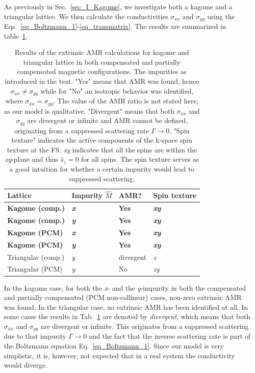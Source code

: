 \documentclass[prb,showpacs,amsmath,amssymb,superscriptaddress,twocolumn,floatfix]{revtex4-1}
\begin{document}
As previously in Sec.~\ref{sec_I_Kagome}, we investigate both a kagome and a triangular lattice. We then calculate the conductivities $\sigma_{xx}$ and $\sigma_{yy}$ using the Eqs.~\ref{eq_Boltzmann_1}-\ref{eq_transmatrix}. The results are summarized in table~\ref{T_extrinsic}.\\

\begin{table}
	\begin{tabular}{llll}
		Lattice & Impurity $\hat{M}$ & AMR? & Spin texture \\
		\hline 
		\textbf{Kagome (comp.)} & \textbf{\textit{x}} & \textbf{Yes} & \textbf{\textit{xy}} \\
		\textbf{Kagome (comp.)} & \textbf{\textit{y}} & \textbf{Yes} & \textbf{\textit{xy}} \\
		\textbf{Kagome (PCM)} & \textbf{\textit{x}} & \textbf{Yes} & \textbf{\textit{xy}} \\
		\textbf{Kagome (PCM)} & \textbf{\textit{y}} & \textbf{Yes} & \textbf{\textit{xy}} \\
		\hline 
		Triangular (comp.) & \textit{y} & divergent & \textit{z} \\
		Triangular (PCM) & \textit{y} & No & \textit{zy} \\
	\end{tabular}
	\caption{Results of the extrinsic AMR calculations for kagome and triangular lattice in both compensated and partially compensated magnetic configurations. The impurities as introduced in the text. "Yes" means that AMR was found, hence $\sigma_{xx} \neq \sigma_{yy}$ while for "No" an isotropic behavior was identified, where $\sigma_{xx} = \sigma_{yy}$. The value of the AMR ratio is not stated here, as our model is qualitative. "Divergent" means that both $\sigma_{xx}$ and $\sigma_{yy}$ are divergent or infinite and AMR cannot be defined, originating from a suppressed scattering rate $\Gamma \rightarrow 0$. "Spin texture" indicates the active components of the k-space spin texture at the FS. \textit{xy} indicates that all the spins are within the \textit{xy}-plane and thus $\hat{s}_z = 0$ for all spins. The spin texture serves as a good intuition for whether a certain impurity would lead to suppressed scattering.}
	\label{T_extrinsic}
\end{table}


In the kagome case, for both the \textit{x}- and the \textit{y}-impurity in both the compensated and partially compensated (PCM non-collinear) cases, non-zero extrinsic AMR was found. In the triangular case, no extrinsic AMR has been identified at all. In some cases the results in Tab.~\ref{T_extrinsic} are denoted by \textit{divergent}, which means that both $\sigma_{xx}$ and $\sigma_{yy}$ are divergent or infinite. This originates from a suppressed scattering due to that impurity $\Gamma \rightarrow 0$ and the fact that the inverse scattering rate is part of the Boltzmann equation Eq.~\ref{eq_Boltzmann_1}. Since our model is very simplistic, it is, however, not expected that in a real system the conductivity would diverge.
\end{document}
